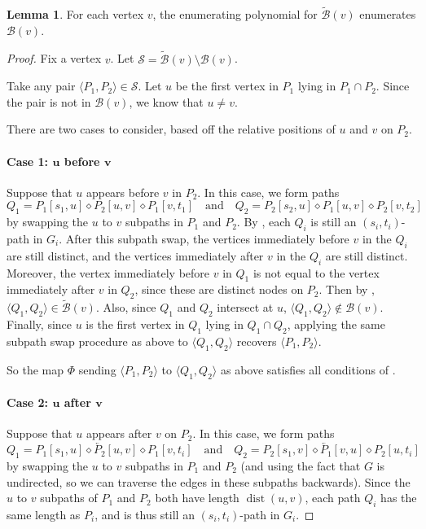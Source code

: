 \documentclass[11pt]{article}
\newcommand{\dia}{\diamond}
\DeclareMathOperator{\dist}{dist}
\newcommand{\ca}{\mathcal}
\newcommand{\rev}{\overleftarrow}
\theoremstyle{definition}
\newtheorem{lemma}[theorem]{Lemma}
\begin{document}
\begin{lemma}
\label{lem:relax-B}
    For each vertex $v$, the  enumerating polynomial for $\tilde{\ca{B}}(v)$ enumerates $\ca{B}(v)$.
\end{lemma}
\begin{proof}
    Fix a vertex $v$.
    Let $\ca{S} = \tilde{\ca{B}}(v)\setminus\ca{B}(v)$.

    Take any pair $\langle P_1,P_2\rangle\in\ca{S}$.
    Let $u$ be the first vertex in $P_1$ lying in $P_1\cap P_2$.
    Since the pair is not in $\ca{B}(v)$, we know that $u\neq v$.
    
    There are two cases to consider, based off the relative positions of $u$ and $v$ on $P_2$.

    \paragraph{Case 1: $\boldsymbol{u}$ before $\boldsymbol{v}$}  Suppose that $u$ appears before $v$ in $P_2$.
    In this case, we  form paths 
        \[Q_1 = P_1[s_1,u]\dia P_2[u,v]\dia P_1[v,t_1]\quad\text{and}\quad Q_2 = P_2[s_2,u]\dia P_1[u,v]\dia P_2[v,t_2]\]
    by swapping the $u$ to $v$ subpaths in $P_1$ and $P_2$.
    By , each $Q_i$ is still an $(s_i,t_i)$-path in $G_i$.
    After this subpath swap, the vertices immediately before  $v$ in the $Q_i$ are still distinct, and the vertices immediately after $v$ in the $Q_i$ are still distinct.
    Moreover, the vertex immediately before $v$ in $Q_1$ is not equal to the vertex immediately after $v$ in $Q_2$, since these are distinct nodes on  $P_2$.
    Then by , $\langle Q_1,Q_2\rangle\in\tilde{\ca{B}}(v)$.
    Also, since $Q_1$ and $Q_2$ intersect at $u$, $\langle Q_1,Q_2\rangle\not\in\ca{B}(v)$.
    Finally, since $u$ is the first vertex in $Q_1$ lying in $Q_1\cap Q_2$, applying the same subpath swap procedure as above to $\langle Q_1,Q_2\rangle$ recovers $\langle P_1,P_2\rangle$.
    
    So the map $\Phi$ sending $\langle P_1,P_2\rangle$ to $\langle Q_1,Q_2\rangle$ as above satisfies all conditions of .

    \paragraph{Case 2: $\boldsymbol{u}$ after $\boldsymbol{v}$} Suppose that $u$ appears after $v$ on $P_2$.
        In this case, we form paths 
        \[Q_1 = P_1[s_1,u]\dia \rev{P_2}[u,v]\dia P_1[v,t_i]\quad\text{and}\quad 
        Q_2 = P_2[s_1,v]\dia \rev{P_1}[v,u]\dia P_2[u,t_i]\]
    by swapping the $u$ to $v$ subpaths in $P_1$ and $P_2$ (and using the fact that $G$ is undirected, so we can traverse the edges in these subpaths backwards).
    Since the $u$ to $v$ subpaths of $P_1$  and $P_2$ both have length $\dist(u,v)$, each path $Q_i$ has the same length as $P_i$, and is thus still an $(s_i,t_i)$-path in $G_i$.


\end{proof}
\end{document}
